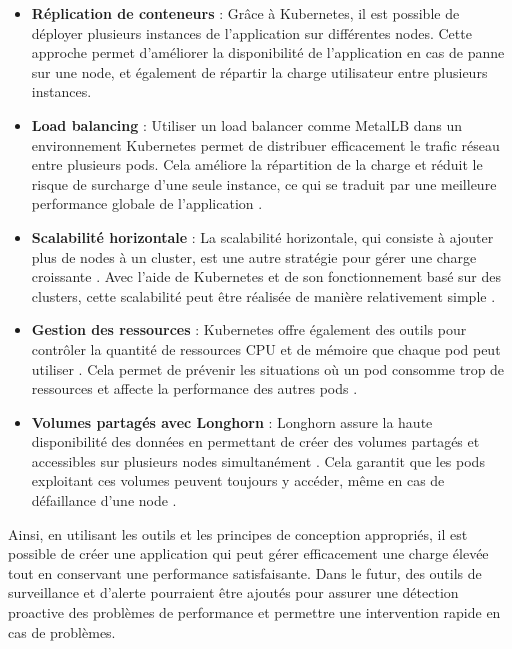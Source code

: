 \begin{itemize}
    \item \textbf{Réplication de conteneurs} : Grâce à Kubernetes, il est possible de déployer plusieurs instances de l'application sur différentes nodes.
    Cette approche permet d'améliorer la disponibilité de l'application en cas de panne sur une node, et également de répartir la charge utilisateur entre plusieurs instances.\\

    \item \textbf{Load balancing} : Utiliser un load balancer comme MetalLB dans un environnement Kubernetes permet de distribuer efficacement le trafic réseau entre plusieurs pods.
    Cela améliore la répartition de la charge et réduit le risque de surcharge d'une seule instance, ce qui se traduit par une meilleure performance globale de l'application .\\

    \item \textbf{Scalabilité horizontale} : La scalabilité horizontale, qui consiste à ajouter plus de nodes à un cluster, est une autre stratégie pour gérer une charge croissante .
    Avec l'aide de Kubernetes et de son fonctionnement basé sur des clusters, cette scalabilité peut être réalisée de manière relativement simple .\\

    \item \textbf{Gestion des ressources} : Kubernetes offre également des outils pour contrôler la quantité de ressources CPU et de mémoire que chaque pod peut utiliser .
    Cela permet de prévenir les situations où un pod consomme trop de ressources et affecte la performance des autres pods .\\

    \item \textbf{Volumes partagés avec Longhorn} : Longhorn assure la haute disponibilité des données en permettant de créer des volumes partagés et accessibles sur plusieurs nodes simultanément .
    Cela garantit que les pods exploitant ces volumes peuvent toujours y accéder, même en cas de défaillance d'une node .\\
\end{itemize}

Ainsi, en utilisant les outils et les principes de conception appropriés, il est possible de créer une application qui peut gérer efficacement une charge élevée tout en conservant une performance satisfaisante.
Dans le futur, des outils de surveillance et d'alerte pourraient être ajoutés pour assurer une détection proactive des problèmes de performance et permettre une intervention rapide en cas de problèmes.

